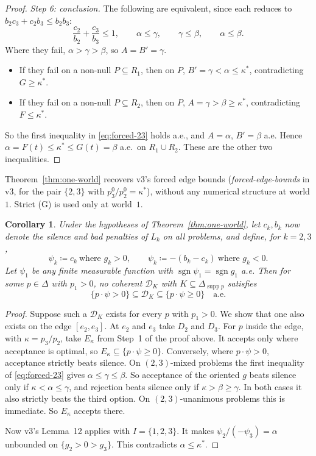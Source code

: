 \documentclass[11pt]{article}
\newtheorem{corollary}[theorem]{Corollary}
\theoremstyle{remark}\newtheorem{remark}[theorem]{Remark}
\newcommand{\Dscr}{\mathcal D}
\newcommand{\supp}{\operatorname{supp}}
\begin{document}
\begin{proof}
\emph{Step 6: conclusion.} The following are equivalent, since each reduces to
$b_2c_3+c_2b_3\le b_2b_3$:
\[
 \frac{c_2}{b_2}+\frac{c_3}{b_3}\le1,\qquad \alpha\le\gamma,\qquad
 \gamma\le\beta,\qquad \alpha\le\beta.
\]
Where they fail, $\alpha>\gamma>\beta$, so $A=B'=\gamma$.
\begin{itemize}[leftmargin=*,itemsep=1pt]
\item If they fail on a non-null $P\subseteq R_1$, then on $P$,
$B'=\gamma<\alpha\le\kappa^*$, contradicting $G\ge\kappa^*$.
\item If they fail on a non-null $P\subseteq R_2$, then on $P$,
$A=\gamma>\beta\ge\kappa^*$, contradicting $F\le\kappa^*$.
\end{itemize}
So the first inequality in \eqref{eq:forced-23} holds a.e., and $A=\alpha$,
$B'=\beta$ a.e. Hence $\alpha=F(t)\le\kappa^*\le G(t)=\beta$ a.e.\ on
$R_1\cup R_2$. These are the other two inequalities.
\end{proof}

Theorem~\ref{thm:one-world} recovers v3's forced edge bounds
(\emph{forced-edge-bounds} in v3, for the pair $\{2,3\}$ with
$p^0_3/p^0_2=\kappa^*$), without any numerical structure at world $1$. Strict
(G) is used only at world~$1$.

\begin{corollary}\label{cor:reduction}
Under the hypotheses of Theorem~\ref{thm:one-world}, let $c_k,b_k$ now denote
the silence and bad penalties of $L_k$ on all problems, and define, for
$k=2,3$,
\[
 \psi_k\coloneqq c_k\ \text{where }g_k>0,\qquad
 \psi_k\coloneqq-(b_k-c_k)\ \text{where }g_k<0.
\]
Let $\psi_1$ be any finite measurable function with
$\operatorname{sgn}\psi_1=\operatorname{sgn}g_1$ a.e. Then for some $p\in\Delta$
with $p_1>0$, no coherent $\Dscr_K$ with $K\subseteq\Delta_{\supp p}$ satisfies
\[
 \{p\cdot\psi>0\}\subseteq\Dscr_K\subseteq\{p\cdot\psi\ge0\}
 \quad\text{a.e.}
\]
\end{corollary}
\begin{proof}
Suppose such a $\Dscr_K$ exists for every $p$ with $p_1>0$. We show that one
also exists on the edge $[e_2,e_3]$. At $e_2$ and $e_3$ take $D_2$ and $D_3$.
For $p$ inside the edge, with $\kappa=p_3/p_2$, take $E_\kappa$ from Step~1 of
the proof above. It accepts only where acceptance is optimal, so
$E_\kappa\subseteq\{p\cdot\psi\ge0\}$. Conversely, where $p\cdot\psi>0$,
acceptance strictly beats silence. On $(2,3)$-mixed problems the first
inequality of \eqref{eq:forced-23} gives $\alpha\le\gamma\le\beta$. So
acceptance of the oriented $g$ beats silence only if $\kappa<\alpha\le\gamma$,
and rejection beats silence only if $\kappa>\beta\ge\gamma$. In both cases it
also strictly beats the third option. On $(2,3)$-unanimous problems this is
immediate. So $E_\kappa$ accepts there.

Now v3's Lemma~12 applies with $I=\{1,2,3\}$. It makes
$\psi_2/(-\psi_3)=\alpha$ unbounded on $\{g_2>0>g_3\}$. This contradicts
$\alpha\le\kappa^*$.
\end{proof}
\end{document}
